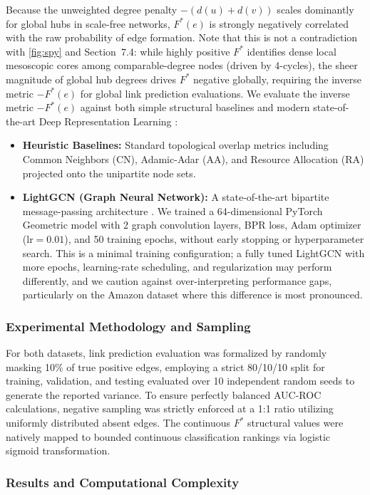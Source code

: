 \documentclass{siuro250211}
\theoremstyle{remark}
\theoremstyle{plain}
\begin{document}
Because the unweighted degree penalty $-(d(u) + d(v))$ scales dominantly for global hubs in scale-free networks, $F^*(e)$ is strongly negatively correlated with the raw probability of edge formation. Note that this is not a contradiction with \cref{fig:spy} and Section~7.4: while highly positive $F^*$ identifies dense local mesoscopic cores among comparable-degree nodes (driven by 4-cycles), the sheer magnitude of global hub degrees drives $F^*$ negative globally, requiring the inverse metric $-F^*(e)$ for global link prediction evaluations. We evaluate the inverse metric $-F^*(e)$ against both simple structural baselines and modern state-of-the-art Deep Representation Learning \cite{hamilton2017inductive}:
\begin{itemize}
    \item \textbf{Heuristic Baselines:} Standard topological overlap metrics including Common Neighbors (CN), Adamic-Adar (AA), and Resource Allocation (RA) projected onto the unipartite node sets.
    \item \textbf{LightGCN (Graph Neural Network):} A state-of-the-art bipartite message-passing architecture \cite{he2020lightgcn}. We trained a 64-dimensional PyTorch Geometric model with 2 graph convolution layers, BPR loss, Adam optimizer (lr$=0.01$), and 50 training epochs, without early stopping or hyperparameter search. This is a minimal training configuration; a fully tuned LightGCN with more epochs, learning-rate scheduling, and regularization may perform differently, and we caution against over-interpreting performance gaps, particularly on the Amazon dataset where this difference is most pronounced.
\end{itemize}

\subsubsection{Experimental Methodology and Sampling}
For both datasets, link prediction evaluation was formalized by randomly masking 10\% of true positive edges, employing a strict 80/10/10 split for training, validation, and testing evaluated over 10 independent random seeds to generate the reported variance. To ensure perfectly balanced AUC-ROC calculations, negative sampling was strictly enforced at a 1:1 ratio utilizing uniformly distributed absent edges. The continuous $F^*$ structural values were natively mapped to bounded continuous classification rankings via logistic sigmoid transformation.

\subsubsection{Results and Computational Complexity}
\end{document}
